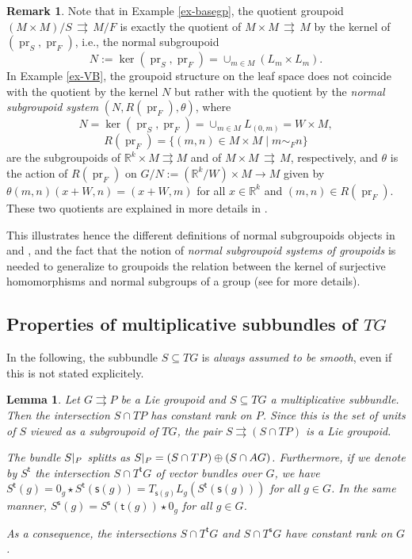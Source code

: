 \documentclass{amsart}
\newtheorem{lemma}[theorem]{Lemma}
\theoremstyle{definition}
\newtheorem{remark}[theorem]{Remark}
\begin{document}
\begin{remark}
Note that in Example \ref{ex-basegp}, 
the quotient groupoid $(M\times M)/S\,{{\rightrightarrows}}\, M/F$ 
is exactly the quotient 
of $M\times M\,{{\rightrightarrows}}\, M$ by the kernel of $(\operatorname{pr}_S, \operatorname{pr}_F)$, i.e., the
normal subgroupoid \[N:=\ker(\operatorname{pr}_S,\operatorname{pr}_F)=\cup_{m\in M}(L_m\times L_m).\]
In Example \ref{ex-VB},
the groupoid structure on the leaf space does not coincide with  the 
quotient by the kernel $N$ but rather with the quotient 
by the \emph{normal subgroupoid system} $(N, R(\operatorname{pr}_F),\theta)$, 
where  \[N=\ker(\operatorname{pr}_S,\operatorname{pr}_F)=\cup_{m\in M}L_{(0,m)}
=W\times M,\] 
\[R(\operatorname{pr}_F)=\{(m,n)\in M\times M\mid m\sim_F n\}\] are the subgroupoids
of ${\mathbb{R}}^k\times M{{\rightrightarrows}} M$ and  
of $M\times M\,{{\rightrightarrows}}\,M$, respectively, and $\theta$ is the action of 
$R(\operatorname{pr}_F)$ on $G/N:=({\mathbb{R}}^k/W)\times M\to M$ given by
$\theta(m,n)(x+W,n)=(x+W,m)$ for all $x\in{\mathbb{R}}^k$ and $(m,n)\in R(\operatorname{pr}_F)$.
These two quotients are  explained in more details in \cite{thesis}.

\medskip

This illustrates hence the different
definitions of normal subgroupoids objects in  
\cite{Mackenzie87} and \cite{Mackenzie05}, and the fact that the notion of
 \emph{normal subgroupoid systems of groupoids}
is needed to generalize to groupoids the relation 
between the kernel of surjective homomorphisms and normal subgroups of a group
(see
\cite{Mackenzie05} for more details). 
\end{remark}

 
\subsection{Properties of multiplicative subbundles of $TG$}
In the following, the subbundle $S\subseteq TG$ is \emph{always assumed 
to be smooth}, even if this is not stated explicitely.
\begin{lemma}\label{constant_rank}
Let $G{{\rightrightarrows}} P$ be a Lie groupoid and
 $S\subseteq TG$ a multiplicative \emph{subbundle}. 
 Then the intersection $S\cap TP$ has constant rank on $P$.
Since this is the set of units of $S$ viewed as a
subgroupoid of $TG$, 
the pair $S{{\rightrightarrows}} (S\cap TP)$
is a Lie groupoid. 

The bundle $S{\arrowvert_{{P}}}$
splitts as $S{\arrowvert_{{P}}}=(S\cap TP)\oplus(S\cap AG)$.
Furthermore, if we denote by $S^{{\mathsf{t}}}$ the intersection 
 $S\cap T^{{\mathsf{t}}} G$ of vector bundles over $G$, 
we have $S^{{\mathsf{t}}}(g)=0_g\star S^{{\mathsf{t}}}({{\mathsf{s}}}(g))
=T_{{{\mathsf{s}}}(g)}L_g\left(S^{{\mathsf{t}}}({{\mathsf{s}}}(g))\right)$ for all
$g\in G$. In the same manner, 
$S^{{\mathsf{s}}}(g)=S^{{\mathsf{s}}}({{\mathsf{t}}}(g))\star 0_g$ for all
$g\in G$.

As a consequence, the intersections $S\cap T^{{\mathsf{t}}} G$ and 
$S\cap T^{{\mathsf{s}}} G$ have  constant rank on $G$.
\end{lemma}
\end{document}
